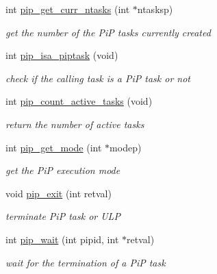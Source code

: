 \begin{DoxyCompactItemize}
\item 
int \hyperlink{group__libpip_gaae85c266f2202048069c5099d90615b6}{pip\-\_\-get\-\_\-curr\-\_\-ntasks} (int $\ast$ntasksp)
\begin{DoxyCompactList}\small\item\em get the number of the Pi\-P tasks currently created \end{DoxyCompactList}\end{DoxyCompactItemize}
\begin{DoxyCompactItemize}
\item 
int \hyperlink{group__libpip_ga4b6905e1eb5ffa6427d72d7e73408639}{pip\-\_\-isa\-\_\-piptask} (void)
\begin{DoxyCompactList}\small\item\em check if the calling task is a Pi\-P task or not \end{DoxyCompactList}\end{DoxyCompactItemize}
\begin{DoxyCompactItemize}
\item 
int \hyperlink{group__libpip_gac45cbabfd20fa2f8f4e9004474922137}{pip\-\_\-count\-\_\-active\-\_\-tasks} (void)
\begin{DoxyCompactList}\small\item\em return the number of active tasks \end{DoxyCompactList}\end{DoxyCompactItemize}
\begin{DoxyCompactItemize}
\item 
int \hyperlink{group__libpip_gab603f68c1ce972a5f3bfb8c95fcfb555}{pip\-\_\-get\-\_\-mode} (int $\ast$modep)
\begin{DoxyCompactList}\small\item\em get the Pi\-P execution mode \end{DoxyCompactList}\end{DoxyCompactItemize}
\begin{DoxyCompactItemize}
\item 
void \hyperlink{group__libpip_ga839952b6edf6edc90d92c06c7cc6784b}{pip\-\_\-exit} (int retval)
\begin{DoxyCompactList}\small\item\em terminate Pi\-P task or U\-L\-P \end{DoxyCompactList}\end{DoxyCompactItemize}
\begin{DoxyCompactItemize}
\item 
int \hyperlink{group__libpip_ga3adad6a3e2311a46b2bfdd9d9062811b}{pip\-\_\-wait} (int pipid, int $\ast$retval)
\begin{DoxyCompactList}\small\item\em wait for the termination of a Pi\-P task \end{DoxyCompactList}\end{DoxyCompactItemize}
